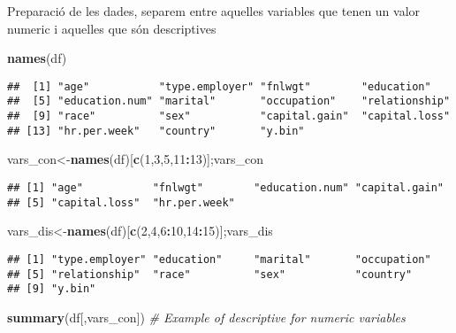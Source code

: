 \documentclass[12pt,]{article}
\newenvironment{Shaded}{\begin{snugshade}}{\end{snugshade}}
\newcommand{\CommentTok}[1]{\textcolor[rgb]{0.56,0.35,0.01}{\textit{#1}}}
\newcommand{\DecValTok}[1]{\textcolor[rgb]{0.00,0.00,0.81}{#1}}
\newcommand{\KeywordTok}[1]{\textcolor[rgb]{0.13,0.29,0.53}{\textbf{#1}}}
\newcommand{\NormalTok}[1]{#1}
\newcommand{\OperatorTok}[1]{\textcolor[rgb]{0.81,0.36,0.00}{\textbf{#1}}}
\begin{document}
Preparació de les dades, separem entre aquelles variables que tenen un
valor numeric i aquelles que són descriptives

\begin{Shaded}
\begin{Highlighting}[]
\KeywordTok{names}\NormalTok{(df)}
\end{Highlighting}
\end{Shaded}

\begin{verbatim}
##  [1] "age"           "type.employer" "fnlwgt"        "education"    
##  [5] "education.num" "marital"       "occupation"    "relationship" 
##  [9] "race"          "sex"           "capital.gain"  "capital.loss" 
## [13] "hr.per.week"   "country"       "y.bin"
\end{verbatim}

\begin{Shaded}
\begin{Highlighting}[]
\NormalTok{vars_con<-}\KeywordTok{names}\NormalTok{(df)[}\KeywordTok{c}\NormalTok{(}\DecValTok{1}\NormalTok{,}\DecValTok{3}\NormalTok{,}\DecValTok{5}\NormalTok{,}\DecValTok{11}\OperatorTok{:}\DecValTok{13}\NormalTok{)];vars_con}
\end{Highlighting}
\end{Shaded}

\begin{verbatim}
## [1] "age"           "fnlwgt"        "education.num" "capital.gain" 
## [5] "capital.loss"  "hr.per.week"
\end{verbatim}

\begin{Shaded}
\begin{Highlighting}[]
\NormalTok{vars_dis<-}\KeywordTok{names}\NormalTok{(df)[}\KeywordTok{c}\NormalTok{(}\DecValTok{2}\NormalTok{,}\DecValTok{4}\NormalTok{,}\DecValTok{6}\OperatorTok{:}\DecValTok{10}\NormalTok{,}\DecValTok{14}\OperatorTok{:}\DecValTok{15}\NormalTok{)];vars_dis}
\end{Highlighting}
\end{Shaded}

\begin{verbatim}
## [1] "type.employer" "education"     "marital"       "occupation"   
## [5] "relationship"  "race"          "sex"           "country"      
## [9] "y.bin"
\end{verbatim}

\begin{Shaded}
\begin{Highlighting}[]
\KeywordTok{summary}\NormalTok{(df[,vars_con]) }\CommentTok{# Example of descriptive for numeric variables}
\end{Highlighting}
\end{Shaded}
\end{document}
